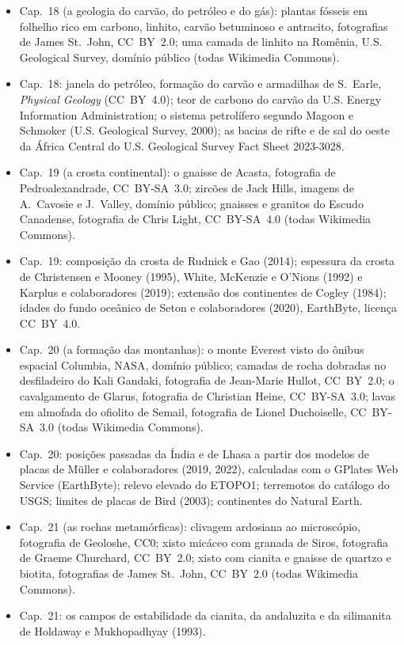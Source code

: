 \begin{itemize}
  \item Cap.~18 (a geologia do carvão, do petróleo e do gás): plantas fósseis em folhelho rico em carbono, linhito, carvão betuminoso e antracito, fotografias de James St.~John, CC~BY~2.0; uma camada de linhito na Romênia, U.S. Geological Survey, domínio público (todas Wikimedia Commons).
  \item Cap.~18: janela do petróleo, formação do carvão e armadilhas de S.~Earle, \emph{Physical Geology} (CC~BY~4.0); teor de carbono do carvão da U.S. Energy Information Administration; o sistema petrolífero segundo Magoon e Schmoker (U.S. Geological Survey, 2000); as bacias de rifte e de sal do oeste da África Central do U.S. Geological Survey Fact Sheet 2023-3028.
  \item Cap.~19 (a crosta continental): o gnaisse de Acasta, fotografia de Pedroalexandrade, CC~BY-SA~3.0; zircões de Jack Hills, imagens de A.~Cavosie e J.~Valley, domínio público; gnaisses e granitos do Escudo Canadense, fotografia de Chris Light, CC~BY-SA~4.0 (todas Wikimedia Commons).
  \item Cap.~19: composição da crosta de Rudnick e Gao (2014); espessura da crosta de Christensen e Mooney (1995), White, McKenzie e O'Nions (1992) e Karplus e colaboradores (2019); extensão dos continentes de Cogley (1984); idades do fundo oceânico de Seton e colaboradores (2020), EarthByte, licença CC~BY~4.0.
  \item Cap.~20 (a formação das montanhas): o monte Everest visto do ônibus espacial Columbia, NASA, domínio público; camadas de rocha dobradas no desfiladeiro do Kali Gandaki, fotografia de Jean-Marie Hullot, CC~BY~2.0; o cavalgamento de Glarus, fotografia de Christian Heine, CC~BY-SA~3.0; lavas em almofada do ofiolito de Semail, fotografia de Lionel Duchoiselle, CC~BY-SA~3.0 (todas Wikimedia Commons).
  \item Cap.~20: posições passadas da Índia e de Lhasa a partir dos modelos de placas de Müller e colaboradores (2019, 2022), calculadas com o GPlates Web Service (EarthByte); relevo elevado do ETOPO1; terremotos do catálogo do USGS; limites de placas de Bird (2003); continentes do Natural Earth.
  \item Cap.~21 (as rochas metamórficas): clivagem ardosiana ao microscópio, fotografia de Geoloshe, CC0; xisto micáceo com granada de Siros, fotografia de Graeme Churchard, CC~BY~2.0; xisto com cianita e gnaisse de quartzo e biotita, fotografias de James St.~John, CC~BY~2.0 (todas Wikimedia Commons).
  \item Cap.~21: os campos de estabilidade da cianita, da andaluzita e da silimanita de Holdaway e Mukhopadhyay (1993).

\end{itemize}

